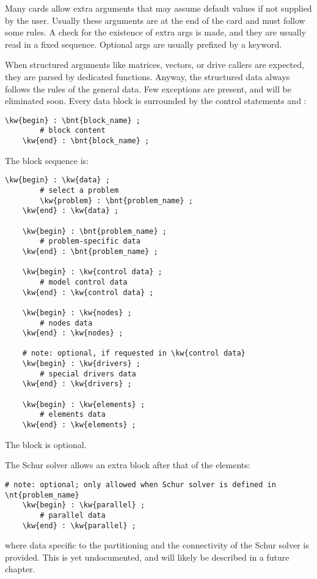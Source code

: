 Many cards allow extra arguments that may assume default values 
if not supplied by the user. 
Usually these arguments are at the end of the card
and must follow some rules. 
A check for the existence of extra args is made,
and they are usually read in a fixed sequence.
Optional args are usually prefixed by a keyword.

When structured arguments like matrices, vectors, or drive callers are
expected, they are parsed by dedicated functions.
Anyway, the structured data always follows the rules of the general data. 
Few exceptions are present, and will be eliminated soon.
Every data block is surrounded by the control statements  and
:
\begin{Verbatim}[commandchars=\\\{\}]
    \kw{begin} : \bnt{block_name} ;
        # block content
    \kw{end} : \bnt{block_name} ;
\end{Verbatim}
The block sequence is:
\begin{Verbatim}[commandchars=\\\{\}]
    \kw{begin} : \kw{data} ;
        # select a problem
        \kw{problem} : \bnt{problem_name} ;
    \kw{end} : \kw{data} ;

    \kw{begin} : \bnt{problem_name} ;
        # problem-specific data
    \kw{end} : \bnt{problem_name} ;

    \kw{begin} : \kw{control data} ;
        # model control data
    \kw{end} : \kw{control data} ;

    \kw{begin} : \kw{nodes} ;
        # nodes data
    \kw{end} : \kw{nodes} ;

    # note: optional, if requested in \kw{control data}
    \kw{begin} : \kw{drivers} ;
        # special drivers data
    \kw{end} : \kw{drivers} ;

    \kw{begin} : \kw{elements} ;
        # elements data
    \kw{end} : \kw{elements} ;
\end{Verbatim}
The  block is optional.

The Schur solver allows an extra block after that of the elements:
\begin{Verbatim}[commandchars=\\\{\}]
    # note: optional; only allowed when Schur solver is defined in \nt{problem_name}
    \kw{begin} : \kw{parallel} ;
        # parallel data
    \kw{end} : \kw{parallel} ;
\end{Verbatim}
where data specific to the partitioning and the connectivity
of the Schur solver is provided.
This is yet undocumented, and will likely be described 
in a future chapter.

